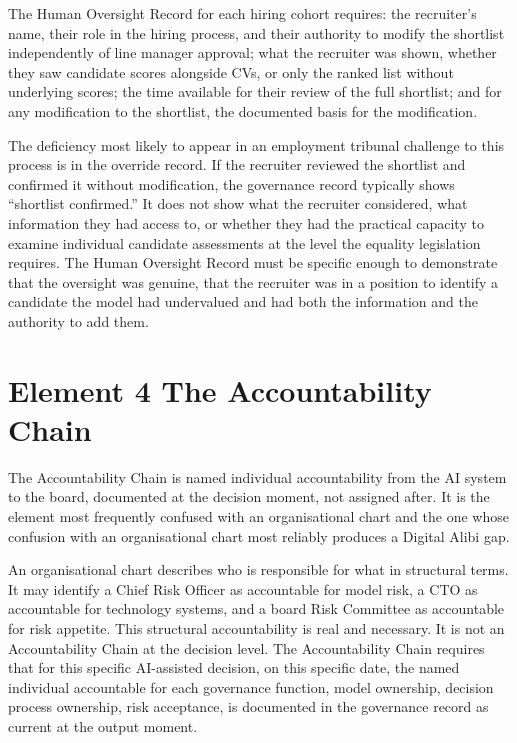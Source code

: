 The Human Oversight Record for each hiring cohort requires: the recruiter's name, their role in the hiring process, and their authority to modify the shortlist independently of line manager approval; what the recruiter was shown, whether they saw candidate scores alongside CVs, or only the ranked list without underlying scores; the time available for their review of the full shortlist; and for any modification to the shortlist, the documented basis for the modification.

The deficiency most likely to appear in an employment tribunal challenge to this process is in the override record. If the recruiter reviewed the shortlist and confirmed it without modification, the governance record typically shows ``shortlist confirmed.'' It does not show what the recruiter considered, what information they had access to, or whether they had the practical capacity to examine individual candidate assessments at the level the equality legislation requires. The Human Oversight Record must be specific enough to demonstrate that the oversight was genuine, that the recruiter was in a position to identify a candidate the model had undervalued and had both the information and the authority to add them.

\scenebreak

\section{Element 4 The Accountability Chain}

The Accountability Chain is named individual accountability from the AI system to the board, documented at the decision moment, not assigned after. It is the element most frequently confused with an organisational chart and the one whose confusion with an organisational chart most reliably produces a Digital Alibi gap.

An organisational chart describes who is responsible for what in structural terms. It may identify a Chief Risk Officer as accountable for model risk, a CTO as accountable for technology systems, and a board Risk Committee as accountable for risk appetite. This structural accountability is real and necessary. It is not an Accountability Chain at the decision level. The Accountability Chain requires that for this specific AI-assisted decision, on this specific date, the named individual accountable for each governance function, model ownership, decision process ownership, risk acceptance, is documented in the governance record as current at the output moment.

